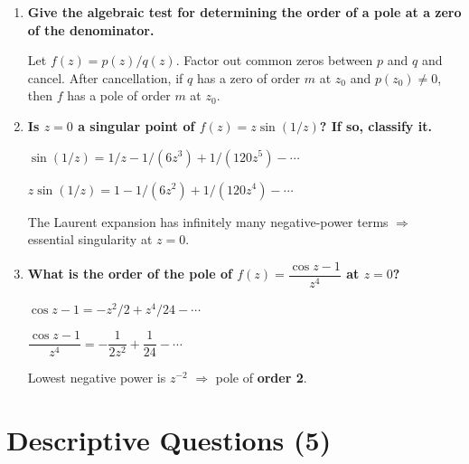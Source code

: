 \documentclass[12pt,a4paper]{article}
\begin{document}
\begin{enumerate}[label=\textbf{V\arabic*.}, leftmargin=2.5em]
\item \textbf{Give the algebraic test for determining the order of a pole at a zero of the
denominator.}

Let $f(z) = p(z)/q(z)$. Factor out common zeros between $p$ and $q$ and cancel. After
cancellation, if $q$ has a zero of order $m$ at $z_0$ and $p(z_0) \neq 0$, then $f$ has a pole
of order $m$ at $z_0$.

\item \textbf{Is $z = 0$ a singular point of $f(z) = z\sin(1/z)$? If so, classify it.}

$\sin(1/z) = 1/z - 1/(6z^3) + 1/(120z^5) - \cdots$

$z\sin(1/z) = 1 - 1/(6z^2) + 1/(120z^4) - \cdots$

The Laurent expansion has infinitely many negative-power terms $\Rightarrow$ essential
singularity at $z = 0$.

\item \textbf{What is the order of the pole of $f(z) = \dfrac{\cos z - 1}{z^4}$ at $z = 0$?}

$\cos z - 1 = -z^2/2 + z^4/24 - \cdots$

$\dfrac{\cos z - 1}{z^4} = -\dfrac{1}{2z^2} + \dfrac{1}{24} - \cdots$

Lowest negative power is $z^{-2}$ $\Rightarrow$ pole of \textbf{order 2}.

\end{enumerate}

\section{Descriptive Questions (5)}
\end{document}
